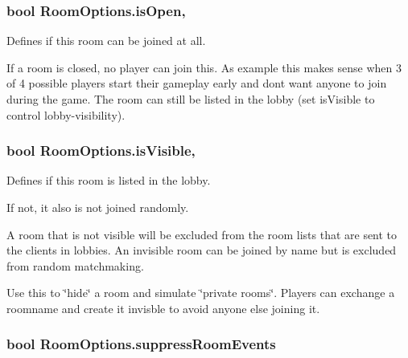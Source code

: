 \subsubsection[{\texorpdfstring{is\+Open}{isOpen}}]{\setlength{\rightskip}{0pt plus 5cm}bool Room\+Options.\+is\+Open\hspace{0.3cm}{\ttfamily [get]}, {\ttfamily [set]}}\hypertarget{class_room_options_adcfa176960d9ab8c0e3667d7c6810192}{}\label{class_room_options_adcfa176960d9ab8c0e3667d7c6810192}


Defines if this room can be joined at all. 

If a room is closed, no player can join this. As example this makes sense when 3 of 4 possible players start their gameplay early and don\textquotesingle{}t want anyone to join during the game. The room can still be listed in the lobby (set is\+Visible to control lobby-\/visibility). 
\subsubsection[{\texorpdfstring{is\+Visible}{isVisible}}]{\setlength{\rightskip}{0pt plus 5cm}bool Room\+Options.\+is\+Visible\hspace{0.3cm}{\ttfamily [get]}, {\ttfamily [set]}}\hypertarget{class_room_options_a750b1c08061aa357ae1d1e189cf8b66c}{}\label{class_room_options_a750b1c08061aa357ae1d1e189cf8b66c}


Defines if this room is listed in the lobby. 

If not, it also is not joined randomly.

A room that is not visible will be excluded from the room lists that are sent to the clients in lobbies. An invisible room can be joined by name but is excluded from random matchmaking.

Use this to \char`\"{}hide\char`\"{} a room and simulate \char`\"{}private rooms\char`\"{}. Players can exchange a roomname and create it invisble to avoid anyone else joining it. 
\subsubsection[{\texorpdfstring{suppress\+Room\+Events}{suppressRoomEvents}}]{\setlength{\rightskip}{0pt plus 5cm}bool Room\+Options.\+suppress\+Room\+Events\hspace{0.3cm}{\ttfamily [get]}}\hypertarget{class_room_options_a0322774781bc0f5a76e8ea607af453ee}{}\label{class_room_options_a0322774781bc0f5a76e8ea607af453ee}


